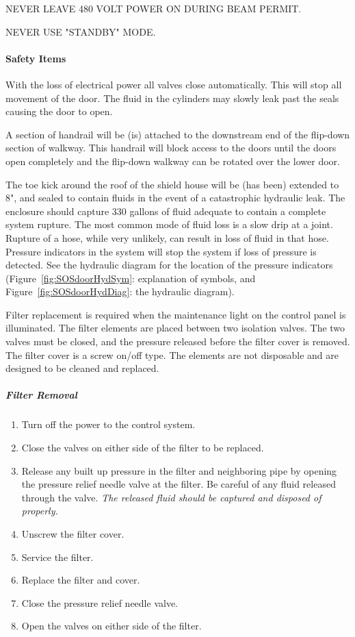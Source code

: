 NEVER LEAVE 480 VOLT POWER ON DURING BEAM PERMIT.

NEVER USE "STANDBY" MODE.



\paragraph{Safety Items}

With the loss of electrical power all valves close automatically. This will
stop all movement of the door. The fluid in the cylinders may slowly leak
past the seals causing the door to open.

A section of handrail will be (is) attached to the downstream end of the
flip-down section of walkway. This handrail will block access to the doors
until the doors open completely and the flip-down walkway can be rotated
over the lower door.

The toe kick around the roof of the shield house will be (has been)
extended to 8", and sealed to contain fluids in the event of a catastrophic
hydraulic leak. The enclosure should capture 330 gallons of fluid adequate
to contain a complete system rupture.  The most common mode of fluid
loss is a slow drip at a joint. Rupture of a hose, while very unlikely, can
result in loss of fluid in that hose. Pressure indicators in the system
will stop
the system if loss of pressure is detected. See the hydraulic diagram for
the location of the pressure indicators (Figure~\ref{fig:SOSdoorHydSym}: explanation of symbols,
and Figure~\ref{fig:SOSdoorHydDiag}: the hydraulic diagram).

Filter replacement is required when the maintenance light on the control
panel is illuminated. The filter elements are placed between two isolation
valves. The two valves must be closed, and the pressure released before
the filter cover is removed. The filter cover is a screw on/off type. The
elements are not disposable and are designed to be cleaned and replaced.

\subparagraph{Filter Removal}

\begin{enumerate}
\item{Turn off the power to the control system.}
\item{Close the valves on either side of the filter to be replaced.}
\item{Release any built up pressure in the filter and neighboring pipe by
opening the pressure relief needle valve at the filter. Be careful of any fluid
released through the valve. {\sl The released fluid should be captured and
disposed of properly.}}
\item{Unscrew the filter cover.}
\item{Service the filter.}
\item{Replace the filter and cover.}
\item{Close the pressure relief needle valve.}
\item{Open the valves on either side of the filter.}
\end{enumerate}

